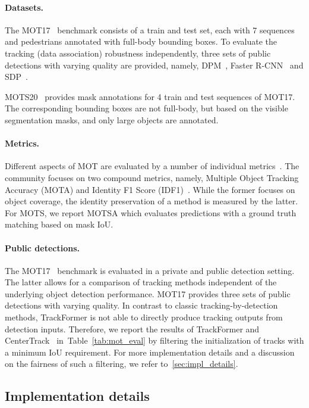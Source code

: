 \documentclass[10pt,twocolumn,letterpaper]{article}
\newcommand{\tabref}[1]{Table~\ref{#1}}
\begin{document}
\paragraph{Datasets.}

The {MOT17}~\cite{mot17} benchmark consists of a train and test set, each with 7 sequences and pedestrians annotated with full-body bounding boxes.
To evaluate the tracking (data association) robustness independently, three sets of public detections with varying quality are provided, namely, DPM~\cite{dpmpami2009}, Faster R-CNN~\cite{rennips2015} and SDP~\cite{sdpYangcvpr2016}.

MOTS20~\cite{MOTS} provides mask annotations for 4 train and test sequences of MOT17.
The corresponding bounding boxes are not full-body, but based on the visible segmentation masks, and only large objects are annotated.

\paragraph{Metrics.}  \label{sec:metrics}
Different aspects of MOT are evaluated by a number of individual metrics~\cite{clear_mot}.
The community focuses on two compound metrics, namely, Multiple Object Tracking Accuracy (MOTA) and Identity F1 Score (IDF1)~\cite{metrics}.
While the former focuses on object coverage, the identity preservation of a method is measured by the latter.
For MOTS, we report MOTSA which evaluates predictions with a ground truth matching based on mask IoU.

\paragraph{Public detections.}
The MOT17~\cite{MOT16} benchmark is evaluated in a private and public detection setting.
The latter allows for a comparison of tracking methods independent of the underlying object detection performance.
MOT17 provides three sets of public detections with varying quality.
In contrast to classic tracking-by-detection methods, TrackFormer is not able to directly produce tracking outputs from detection inputs.
Therefore, we report the results of TrackFormer and CenterTrack~\cite{center_track} in~\tabref{tab:mot_eval} by filtering the initialization of tracks with a minimum IoU requirement.
For more implementation details and a discussion on the fairness of such a filtering, we refer to~\ref{sec:impl_details}. 

\subsection{Implementation details} \label{sec:imp_details}
\end{document}
